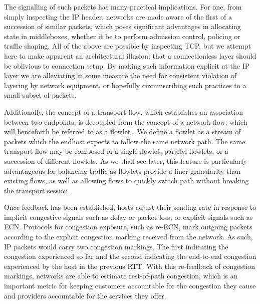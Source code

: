 The signalling of such packets has many practical implications. 
For one, from simply inspecting the \ac{IP} header, networks are made aware of the first of a succession of similar packets, which poses significant advantages in allocating state in middleboxes, whether it be to perform admission control, policing or traffic shaping. 
All of the above are possible by inspecting \ac{TCP}, but we attempt here to make apparent an architectural illusion: that a connectionless layer should be oblivious to connection setup. 
By making such information explicit at the \ac{IP} layer we are alleviating in some measure the need for consistent violation of layering by network equipment, or hopefully circumscribing such practices to a small subset of packets.

Additionally, the concept of a transport flow, which establishes an association between two endpoints, is decoupled from the concept of a network flow, which will henceforth be referred to as a flowlet \cite{Sinha:2004p124}. 
We define a flowlet as a stream of packets which the endhost expects to follow the same network path. 
The same transport flow may be composed of a single flowlet, parallel flowlets, or a succession of different flowlets. 
As we shall see later, this feature is particularly advantageous for balancing traffic as flowlets provide a finer granularity than existing flows, as well as allowing flows to quickly switch path without breaking the transport session.


Once feedback has been established, hosts adjust their sending rate in response to implicit congestive signals such as delay or packet loss, or explicit signals such as \ac{ECN}. Protocols for congestion exposure, such as re-\ac{ECN}, mark outgoing packets according to the explicit congestion marking received from the network. As such, \ac{IP} packets would carry two congestion markings. The first indicating the congestion experienced so far and the second indicating the end-to-end congestion experienced by the host in the previous RTT. With this re-feedback of congestion markings, networks are able to estimate rest-of-path congestion, which is an important metric for keeping customers accountable for the congestion they cause and providers accountable for the services they offer.

